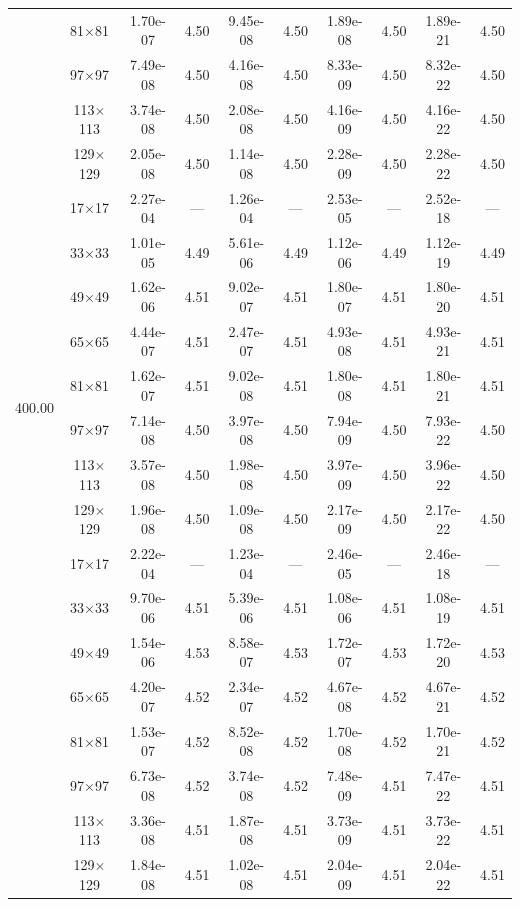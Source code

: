 \begin{table}[H]
{\begin{tabular*}{\textwidth}{@{\extracolsep\fill}c|c|cc|cc|cc|cc@{}}
                & 81$\times$81 & 1.70e-07 & 4.50 & 9.45e-08 & 4.50 & 1.89e-08 & 4.50 & 1.89e-21 & 4.50 \\
                & 97$\times$97 & 7.49e-08 & 4.50 & 4.16e-08 & 4.50 & 8.33e-09 & 4.50 & 8.32e-22 & 4.50 \\
                & 113$\times$113 & 3.74e-08 & 4.50 & 2.08e-08 & 4.50 & 4.16e-09 & 4.50 & 4.16e-22 & 4.50 \\
                & 129$\times$129 & 2.05e-08 & 4.50 & 1.14e-08 & 4.50 & 2.28e-09 & 4.50 & 2.28e-22 & 4.50 \\
                \midrule
                \multirow{10}{*}{400.00} & 17$\times$17 & 2.27e-04 & --- & 1.26e-04 & --- & 2.53e-05 & --- & 2.52e-18 & --- \\
                & 33$\times$33 & 1.01e-05 & 4.49 & 5.61e-06 & 4.49 & 1.12e-06 & 4.49 & 1.12e-19 & 4.49 \\
                & 49$\times$49 & 1.62e-06 & 4.51 & 9.02e-07 & 4.51 & 1.80e-07 & 4.51 & 1.80e-20 & 4.51 \\
                & 65$\times$65 & 4.44e-07 & 4.51 & 2.47e-07 & 4.51 & 4.93e-08 & 4.51 & 4.93e-21 & 4.51 \\
                & 81$\times$81 & 1.62e-07 & 4.51 & 9.02e-08 & 4.51 & 1.80e-08 & 4.51 & 1.80e-21 & 4.51 \\
                & 97$\times$97 & 7.14e-08 & 4.50 & 3.97e-08 & 4.50 & 7.94e-09 & 4.50 & 7.93e-22 & 4.50 \\
                & 113$\times$113 & 3.57e-08 & 4.50 & 1.98e-08 & 4.50 & 3.97e-09 & 4.50 & 3.96e-22 & 4.50 \\
                & 129$\times$129 & 1.96e-08 & 4.50 & 1.09e-08 & 4.50 & 2.17e-09 & 4.50 & 2.17e-22 & 4.50 \\
                \midrule
                \multirow{10}{*}{1000.00} & 17$\times$17 & 2.22e-04 & --- & 1.23e-04 & --- & 2.46e-05 & --- & 2.46e-18 & --- \\
                & 33$\times$33 & 9.70e-06 & 4.51 & 5.39e-06 & 4.51 & 1.08e-06 & 4.51 & 1.08e-19 & 4.51 \\
                & 49$\times$49 & 1.54e-06 & 4.53 & 8.58e-07 & 4.53 & 1.72e-07 & 4.53 & 1.72e-20 & 4.53 \\
                & 65$\times$65 & 4.20e-07 & 4.52 & 2.34e-07 & 4.52 & 4.67e-08 & 4.52 & 4.67e-21 & 4.52 \\
                & 81$\times$81 & 1.53e-07 & 4.52 & 8.52e-08 & 4.52 & 1.70e-08 & 4.52 & 1.70e-21 & 4.52 \\
                & 97$\times$97 & 6.73e-08 & 4.52 & 3.74e-08 & 4.52 & 7.48e-09 & 4.51 & 7.47e-22 & 4.51 \\
                & 113$\times$113 & 3.36e-08 & 4.51 & 1.87e-08 & 4.51 & 3.73e-09 & 4.51 & 3.73e-22 & 4.51 \\
                & 129$\times$129 & 1.84e-08 & 4.51 & 1.02e-08 & 4.51 & 2.04e-09 & 4.51 & 2.04e-22 & 4.51 \\
                \bottomrule
            \end{tabular*}
	}{%
		\fdadospesquisa
	}
\end{table}

